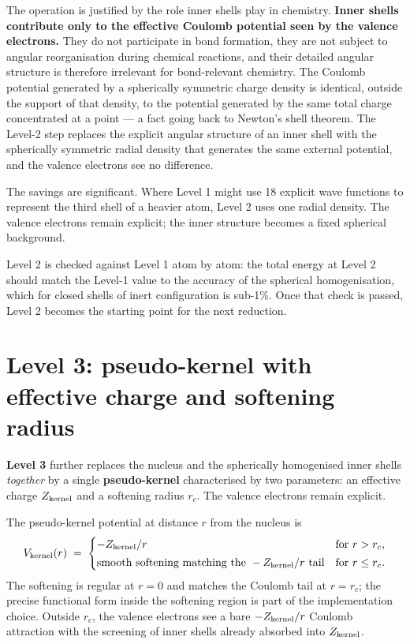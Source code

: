 The operation is justified by the role inner shells play in chemistry. \textbf{Inner shells contribute only to the effective Coulomb potential seen by the valence electrons.} They do not participate in bond formation, they are not subject to angular reorganisation during chemical reactions, and their detailed angular structure is therefore irrelevant for bond-relevant chemistry. The Coulomb potential generated by a spherically symmetric charge density is identical, outside the support of that density, to the potential generated by the same total charge concentrated at a point --- a fact going back to Newton's shell theorem. The Level-2 step replaces the explicit angular structure of an inner shell with the spherically symmetric radial density that generates the same external potential, and the valence electrons see no difference.

The savings are significant. Where Level 1 might use 18 explicit wave functions to represent the third shell of a heavier atom, Level 2 uses one radial density. The valence electrons remain explicit; the inner structure becomes a fixed spherical background.

Level 2 is checked against Level 1 atom by atom: the total energy at Level 2 should match the Level-1 value to the accuracy of the spherical homogenisation, which for closed shells of inert configuration is sub-1\%. Once that check is passed, Level 2 becomes the starting point for the next reduction.

\section{Level 3: pseudo-kernel with effective charge and softening radius}\label{sec:level3}

\textbf{Level 3} further replaces the nucleus and the spherically homogenised inner shells \emph{together} by a single \textbf{pseudo-kernel} characterised by two parameters: an effective charge $Z_{\rm kernel}$ and a softening radius $r_c$. The valence electrons remain explicit.

The pseudo-kernel potential at distance $r$ from the nucleus is
\begin{equation}\label{eq:pseudo-kernel}
V_{\rm kernel}(r) \;=\;
\begin{cases}
-Z_{\rm kernel}/r & \text{for } r > r_c, \\[2pt]
\text{smooth softening matching the } -Z_{\rm kernel}/r \text{ tail} & \text{for } r \le r_c.
\end{cases}
\end{equation}
The softening is regular at $r = 0$ and matches the Coulomb tail at $r = r_c$; the precise functional form inside the softening region is part of the implementation choice. Outside $r_c$, the valence electrons see a bare $-Z_{\rm kernel}/r$ Coulomb attraction with the screening of inner shells already absorbed into $Z_{\rm kernel}$.

